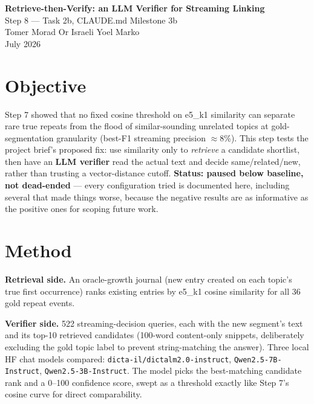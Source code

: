 \documentclass[11pt,a4paper]{article}
\begin{document}
\begin{center}
  {\LARGE \textbf{Retrieve-then-Verify: an LLM Verifier for Streaming Linking}}\\[0.3em]
  {\large Step 8 --- Task 2b, CLAUDE.md Milestone 3b}\\[0.6em]
  {\normalsize Tomer Morad \quad Or Israeli \quad Yoel Marko}\\
  {\normalsize July 2026}
\end{center}

\vspace{0.5em}

\section{Objective}

Step 7 showed that no fixed cosine threshold on e5\_k1 similarity can separate rare true
repeats from the flood of similar-sounding unrelated topics at gold-segmentation granularity
(best-F1 streaming precision $\approx$8\%). This step tests the project brief's proposed fix:
use similarity only to \emph{retrieve} a candidate shortlist, then have an \textbf{LLM verifier}
read the actual text and decide same/related/new, rather than trusting a vector-distance cutoff.
\textbf{Status: paused below baseline, not dead-ended} --- every configuration tried is
documented here, including several that made things worse, because the negative results are as
informative as the positive ones for scoping future work.

\section{Method}

\textbf{Retrieval side.} An oracle-growth journal (new entry created on each topic's true first
occurrence) ranks existing entries by e5\_k1 cosine similarity for all 36 gold repeat events.

\textbf{Verifier side.} 522 streaming-decision queries, each with the new segment's text and its
top-10 retrieved candidates (100-word content-only snippets, deliberately excluding the gold
topic label to prevent string-matching the answer). Three local HF chat models compared:
\texttt{dicta-il/dictalm2.0-instruct}, \texttt{Qwen2.5-7B-Instruct}, \texttt{Qwen2.5-3B-Instruct}.
The model picks the best-matching candidate rank and a 0--100 confidence score, swept as a
threshold exactly like Step 7's cosine curve for direct comparability.
\end{document}
